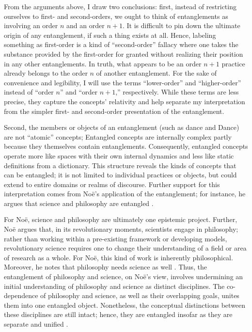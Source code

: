 \documentclass[12pt,letterpaper]{article}
\begin{document}
From the arguments above, I draw two conclusions: first, instead of restricting
ourselves to first- and second-orders, we ought to think of entanglements as
involving an order $n$ and an order $n+1$. It is difficult to pin down the
ultimate origin of any entanglement, if such a thing exists at all. Hence,
labeling something as first-order is a kind of ``second-order'' fallacy where
one takes the substance provided by the first-order for granted without
realizing their position in any other entanglements. In truth, what appears to
be an order $n+1$ practice already belongs to the order $n$ of another
entanglement. For the sake of convenience and legibility, I will use the terms
``lower-order'' and ``higher-order'' instead of ``order $n$'' and ``order
$n+1$,'' respectively. While these terms are less precise, they capture the
concepts' relativity and help separate my interpretation from the simpler first-
and second-order presentation of the entanglement.

Second, the members or objects of an entanglement (such as dance and Dance) are
not ``atomic'' concepts; Entangled concepts are internally complex partly
because they themselves contain entanglements. Consequently, entangled concepts
operate more like spaces with their own internal dynamics and less like static
definitions from a dictionary. This structure reveals the kinds of concepts that
can be entangled; it is not limited to individual practices or objects, but
could extend to entire domains or realms of discourse. Further support for this
interpretation comes from Noë's application of the entanglement; for instance,
he argues that science and philosophy are entangled
\autocite[205]{noeEntanglement2023}.

For Noë, science and philosophy are ultimately one epistemic project. Further,
Noë argues that, in its revolutionary moments, scientists engage in philosophy;
rather than working within a pre-existing framework or developing models,
revolutionary science requires one to change their understanding of a field or
area of research as a whole. For Noë, this kind of work is inherently
philosophical. Moreover, he notes that philosophy needs science as well
\autocite[205]{noeEntanglement2023}. Thus, the entanglement of philosophy and
science, on Noë's view, involves undermining an initial understanding of
philosophy and science as distinct disciplines. The co-dependence of philosophy
and science, as well as their overlapping goals, unites them into one entangled
object. Nonetheless, the conceptual distinctions between these disciplines are
still intact; hence, they are entangled insofar as they are separate and unified
\autocite[205]{noeEntanglement2023}.
\end{document}
